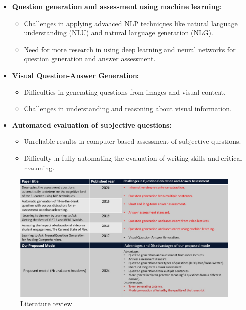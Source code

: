 \begin{itemize}
    \item \textbf{Question generation and assessment using machine learning:}
    \begin{itemize}
        \item Challenges in applying advanced NLP techniques like natural language understanding (NLU) and natural language generation (NLG).
        \item Need for more research in using deep learning and neural networks for question generation and answer assessment.
    \end{itemize}

    \item \textbf{Visual Question-Answer Generation:}
    \begin{itemize}
        \item Difficulties in generating questions from images and visual content.
        \item Challenges in understanding and reasoning about visual information.
    \end{itemize}

    \item \textbf{Automated evaluation of subjective questions:}
    \begin{itemize}
        \item Unreliable results in computer-based assessment of subjective questions.
        \item Difficulty in fully automating the evaluation of writing skills and critical reasoning.
    \end{itemize}
\end{itemize}
 
\newpage
\begin{figure}[h!]
\begin{center}
	\centering
        \includegraphics[max height =\textwidth,
        max width=\textwidth]{figures/Literature review.png}
	\caption{Literature review }
\end{center}
\end{figure}


